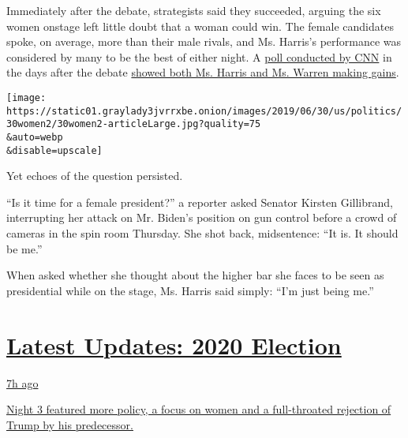 Immediately after the debate, strategists said they succeeded, arguing
the six women onstage left little doubt that a woman could win. The
female candidates spoke, on average, more than their male rivals, and
Ms. Harris's performance was considered by many to be the best of either
night. A
\href{https://www.cnn.com/2019/07/01/politics/2020-democratic-candidates-poll/index.html}{poll
conducted by CNN} in the days after the debate
\href{https://www.nytimes3xbfgragh.onion/2019/07/02/us/politics/kamala-harris-polls.html}{showed
both Ms. Harris and Ms. Warren making gains}.

\texttt{[image: https://static01.graylady3jvrrxbe.onion/images/2019/06/30/us/politics/30women2/30women2-articleLarge.jpg?quality=75\\\&auto=webp\\\&disable=upscale]}

Yet echoes of the question persisted.

``Is it time for a female president?'' a reporter asked Senator Kirsten
Gillibrand, interrupting her attack on Mr. Biden's position on gun
control before a crowd of cameras in the spin room Thursday. She shot
back, midsentence: ``It is. It should be me.''

When asked whether she thought about the higher bar she faces to be seen
as presidential while on the stage, Ms. Harris said simply: ``I'm just
being me.''

\hypertarget{latest-updates-2020-election}{%
\section{\texorpdfstring{\href{https://www.nytimes3xbfgragh.onion/live/2020/08/19/us/dnc-convention-election?action=click\&pgtype=Article\&state=default\&region=MAIN_CONTENT_1\&context=storylines_live_updates}{Latest
Updates: 2020
Election}}{Latest Updates: 2020 Election}}\label{latest-updates-2020-election}}

\href{https://www.nytimes3xbfgragh.onion/live/2020/08/19/us/dnc-convention-election?action=click\&pgtype=Article\&state=default\&region=MAIN_CONTENT_1\&context=storylines_live_updates\#night-3-featured-more-policy-a-focus-on-women-and-a-full-throated-rejection-of-trump-by-his-predecessor}{7h
ago}

\href{https://www.nytimes3xbfgragh.onion/live/2020/08/19/us/dnc-convention-election?action=click\&pgtype=Article\&state=default\&region=MAIN_CONTENT_1\&context=storylines_live_updates\#night-3-featured-more-policy-a-focus-on-women-and-a-full-throated-rejection-of-trump-by-his-predecessor}{Night
3 featured more policy, a focus on women and a full-throated rejection
of Trump by his predecessor.}

